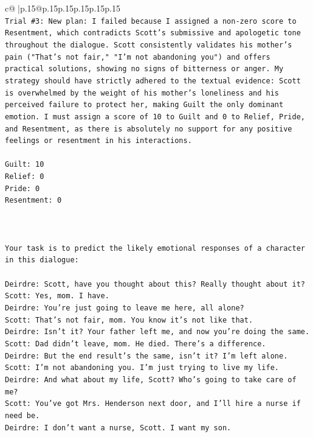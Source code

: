 \documentclass{article}
\begin{document}
{\begin{supertabular}{c@{$\;$}|p{.15\linewidth}@{}p{.15\linewidth}p{.15\linewidth}p{.15\linewidth}p{.15\linewidth}p{.15\linewidth}}
{{{\\ 
\texttt{Trial \#3: New plan: I failed because I assigned a non{-}zero score to Resentment, which contradicts Scott's submissive and apologetic tone throughout the dialogue. Scott consistently validates his mother's pain ("That's not fair," "I'm not abandoning you") and offers practical solutions, showing no signs of bitterness or anger. My strategy should have strictly adhered to the textual evidence: Scott is overwhelmed by the weight of his mother's loneliness and his perceived failure to protect her, making Guilt the only dominant emotion. I must assign a score of 10 to Guilt and 0 to Relief, Pride, and Resentment, as there is absolutely no support for any positive feelings or resentment in his interactions.} \\
\\ 
\texttt{Guilt: 10} \\
\texttt{Relief: 0} \\
\texttt{Pride: 0} \\
\texttt{Resentment: 0} \\
\\ 
\\ 
\\ 
\texttt{Your task is to predict the likely emotional responses of a character in this dialogue:} \\
\\ 
\texttt{Deirdre: Scott, have you thought about this? Really thought about it?} \\
\texttt{Scott: Yes, mom. I have. } \\
\texttt{Deirdre: You're just going to leave me here, all alone?} \\
\texttt{Scott: That's not fair, mom. You know it's not like that.} \\
\texttt{Deirdre: Isn't it? Your father left me, and now you're doing the same.} \\
\texttt{Scott: Dad didn't leave, mom. He died. There's a difference.} \\
\texttt{Deirdre: But the end result's the same, isn't it? I'm left alone.} \\
\texttt{Scott: I'm not abandoning you. I'm just trying to live my life.} \\
\texttt{Deirdre: And what about my life, Scott? Who's going to take care of me?} \\
\texttt{Scott: You've got Mrs. Henderson next door, and I'll hire a nurse if need be.} \\
\texttt{Deirdre: I don't want a nurse, Scott. I want my son.} \\
}}}
\end{supertabular}}
\end{document}

